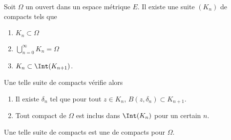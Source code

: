 \begin{lemmaDef}       \label{LemGDeZlOo}
	Soit \( \Omega\) un ouvert dans un espace métrique \( E\). Il existe une suite \( (K_n)\) de compacts tels que
	\begin{enumerate}
		\item
		      \( K_n\subset \Omega\)
		\item
		      \( \bigcup_{n=0}^{\infty}K_n=\Omega\)
		\item
		      \( K_n\subset\Int(K_{n+1})\).
	\end{enumerate}
	Une telle suite de compacts vérifie alors
	\begin{enumerate}
		\item
		      Il existe \( \delta_n\) tel que pour tout \( z\in K_n\), \( B(z,\delta_n)\subset K_{n+1}\).
		\item
		      Tout compact de \( \Omega\) est inclus dans \( \Int(K_n)\) pour un certain \( n\).
	\end{enumerate}
	Une telle suite de compacts est une  de compacts pour \( \Omega\).
\end{lemmaDef}

